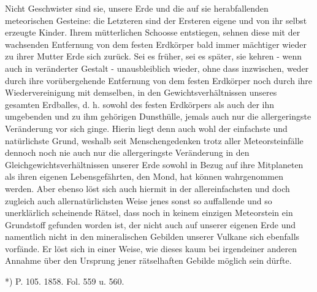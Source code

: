 \documentclass[a4paper, 8pt, oneside, polutonikogreek, german]{article}
\begin{document}
Nicht Geschwister sind sie, unsere Erde und die auf sie herabfallenden meteorischen Gesteine: die Letzteren sind der Ersteren eigene und von ihr selbst erzeugte Kinder. Ihrem mütterlichen Schoosse entstiegen, sehnen diese mit der wachsenden Entfernung von dem festen Erdkörper bald immer mächtiger wieder zu ihrer Mutter Erde sich zurück. Sei es früher, sei es später, sie kehren - wenn auch in veränderter Gestalt - unausbleiblich wieder, ohne dass inzwischen, weder durch ihre vorübergehende Entfernung von dem festen Erdkörper noch durch ihre Wiedervereinigung mit demselben, in den Gewichtsverhältnissen unseres gesamten Erdballes, d. h. sowohl des festen Erdkörpers als auch der ihn umgebenden und zu ihm gehörigen Dunsthülle, jemals auch nur die allergeringste Veränderung vor sich ginge. Hierin liegt denn auch wohl der einfachste und natürlichste Grund, weshalb seit Menschengedenken trotz aller Meteorsteinfälle dennoch noch nie auch nur die allergeringste Veränderung in den Gleichgewichtsverhältnissen unserer Erde sowohl in Bezug auf ihre Mitplaneten als ihren eigenen Lebensgefährten, den Mond, hat können wahrgenommen werden. Aber ebenso löst sich auch hiermit in der allereinfachsten und doch zugleich auch allernatürlichsten Weise jenes sonst so auffallende und so unerklärlich scheinende Rätsel, dass noch in keinem einzigen Meteorstein ein Grundstoff gefunden worden ist, der nicht auch auf unserer eigenen Erde und namentlich nicht in den mineralischen Gebilden unserer Vulkane sich ebenfalls vorfände. Er löst sich in einer Weise, wie dieses kaum bei irgendeiner anderen Annahme über den Ursprung jener rätselhaften Gebilde möglich sein dürfte.

*) P. 105. 1858. Fol. 559 u. 560.
\end{document}
